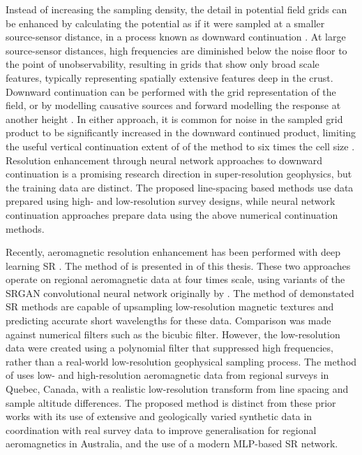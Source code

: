 Instead of increasing the sampling density, the detail in potential field grids can be enhanced by calculating the potential as if it were sampled at a smaller source-sensor distance, in a process known as downward continuation \parencite{bullardDeterminationMassesNecessary1948}.
At large source-sensor distances, high frequencies are diminished below the noise floor to the point of unobservability, resulting in grids that show only broad scale features, typically representing spatially extensive features deep in the crust.
Downward continuation can be performed with the grid representation of the field, or by modelling causative sources and forward modelling the response at another height \parencite{pilkingtonPotentialFieldContinuation2017}.
In either approach, it is common for noise in the sampled grid product to be significantly increased in the downward continued product, limiting the useful vertical continuation extent of of the method to six times the cell size \parencite{dampneyEquivalentSourceTechnique1969,zuoDownwardContinuationTransformation2020}.
Resolution enhancement through neural network approaches to downward continuation \parencite{liStableDownwardContinuation2023,yeHighprecisionDownwardContinuation2022} is a promising research direction in super-resolution geophysics, but the training data are distinct.
The proposed line-spacing based methods use data prepared using high- and low-resolution survey designs, while neural network continuation approaches prepare data using the above numerical continuation methods.

Recently, aeromagnetic resolution enhancement has been performed with deep learning SR \parencite{bavandsavadkoohiHighresolutionAeromagneticMap2023,smithMagneticGridResolution2022}.
The method of \textcite{smithMagneticGridResolution2022} is presented in  of this thesis.
These two approaches operate on regional aeromagnetic data at four times scale, using variants of the SRGAN convolutional neural network originally by \textcite{ledigPhotorealisticSingleImage2017}.
The method of \textcite{smithMagneticGridResolution2022} demonstated SR methods are capable of upsampling low-resolution magnetic textures and predicting accurate short wavelengths for these data.
Comparison was made against numerical filters such as the bicubic filter.
However, the low-resolution data were created using a polynomial filter that suppressed high frequencies, rather than a real-world low-resolution geophysical sampling process.
The method of \textcite{bavandsavadkoohiHighresolutionAeromagneticMap2023} uses low- and high-resolution aeromagnetic data from regional surveys in Quebec, Canada, with a realistic low-resolution transform from line spacing and sample altitude differences.
The proposed method is distinct from these prior works with its use of extensive and geologically varied synthetic data in coordination with real survey data to improve generalisation for regional aeromagnetics in Australia, and the use of a modern MLP-based SR network.

